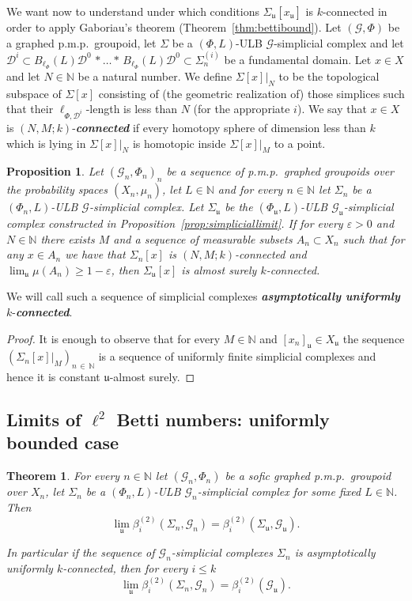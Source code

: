 \documentclass[10pt]{amsart}
\newtheorem{theo}[cdrthm]{Theorem}
\newtheorem{prop}[cdrthm]{Proposition}
\theoremstyle{definition}
\newcommand{\defin}[1]{\textbf{\emph{#1}}}
\newcommand{\Nmath}{\mathbb{N}}
\newcommand{\cg}{\mathcal{G}}
\newcommand{\cd}{\mathcal{D}}
\newcommand{\ul}{\mathfrak{u}}
\newcommand{\eps}{\varepsilon}
\newcommand{\pmp}{p.m.p.\ }
\begin{document}
We want now to understand under which conditions $\Sigma_\ul[x_\ul]$ is $k$-connected in order to apply Gaboriau's theorem (Theorem~\ref{thm:bettibound}). Let $(\cg,\Phi)$ be a graphed \pmp groupoid, let $\Sigma$ be a $(\Phi,L)$-ULB $\cg$-simplicial complex and let $\cd^i\subset B_{\ell_\Phi}(L)\cd^0\,*\ldots*\,B_{\ell_\Phi}(L)\cd^0\subset \Sigma_n^{(i)}$ be a fundamental domain. Let $x\in X$ and let $N\in\Nmath$ be a natural number. We define $\Sigma[x]|_N$ to be the topological subspace of $\Sigma[x]$ consisting of (the geometric realization of) those simplices such that their $\ell_{\Phi,\cd^i}$-length is less than $N$ (for the appropriate $i$). We say that $x\in X$ is $(N,M;k)$-\defin{connected} if every homotopy sphere of dimension less than $k$ which is lying in $\Sigma[x]|_N$ is homotopic inside $\Sigma[x]|_M$ to a point.

\begin{prop}\label{prop:contract}
Let $(\cg_n,\Phi_n)_n$ be a sequence of \pmp graphed groupoids over the probability spaces $(X_n,\mu_n)$, let $L\in\Nmath$ and for every $n\in\Nmath$ let $\Sigma_n$ be a $(\Phi_n,L)$-ULB $\cg$-simplicial complex. Let $\Sigma_\ul$ be the $(\Phi_\ul,L)$-ULB $\cg_\ul$-simplicial complex constructed in Proposition~\ref{prop:simpliciallimit}. If for every $\eps>0$ and $N\in\Nmath$ there exists $M$ and a sequence of measurable subsets $A_n\subset X_n$ such that for any $x\in A_n$ we have that $\Sigma_n[x]$ is $(N,M;k)$-connected and $\lim_\ul\mu(A_n)\geq 1-\eps$, then $\Sigma_\ul[x]$ is almost surely $k$-connected.
\end{prop}

We will call such a sequence of simplicial complexes
\defin{asymptotically uniformly }$k$-\defin{connected}.

\begin{proof}
It is enough to observe that for every $M\in\Nmath$ and $[x_n]_\ul\in X_\ul$ the sequence $(\Sigma_n[x]|_M)_{n\,\in \,\Nmath}$ is a sequence of uniformly finite simplicial complexes and hence it is constant $\ul$-almost surely.
\end{proof}

\subsection{\texorpdfstring{Limits of $\ell^2$ Betti numbers: uniformly bounded case}{Limits of L2 Betti numbers: uniformly bounded case}}

\begin{theo}\label{thm:limitbounded}
For every $n\in\Nmath$ let $(\cg_n,\Phi_n)$ be a \emph{sofic} graphed \pmp groupoid over $X_n$, let $\Sigma_n$ be a $(\Phi_n,L)$-ULB $\cg_n$-simplicial complex for some fixed $L\in\Nmath$. Then
\[
\lim_\ul\beta^{(2)}_i\left(\Sigma_n,\cg_n\right)=\beta^{(2)}_i\left(\Sigma_\ul,\cg_\ul\right).
\]

In particular if the sequence of $\cg_n$-simplicial complexes $\Sigma_n$ is asymptotically uniformly $k$-connected, then for every $i\leq k$
\[
\lim_\ul\beta^{(2)}_i\left(\Sigma_n,\cg_n\right)=\beta^{(2)}_i(\cg_\ul).
\]
\end{theo}
\end{document}
